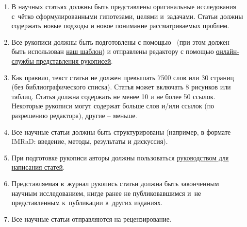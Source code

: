 \begin{enumerate}



\item[1.] В научных статьях должны быть представлены оригинальные исследования с~чётко сформулированными гипотезами, целями и~задачами. Статьи должны содержать новые подходы и новое понимание рассматриваемых проблем.



\item[2.] Все рукописи должны быть подготовлены с помощью \LaTeXe\ (при этом должен быть использован \href{https://www.overleaf.com/read/bzytwtpwfzjj}{наш шаблон}) и отправлены редактору с помощью \href{http://www.mathnet.ru/php/esubmission.phtml?jrnid=vsgtu&wshow=snote&option_lang=rus}{онлайн-службы представления рукописей}.



\item[3.]

Как правило, текст статьи не должен превышать 7500 слов или 30 страниц (без библиографического списка). Статья может включать 8 рисунков или таблиц. Статья должна содержать не менее 10 и не более 50 ссылок. Некоторые рукописи могут содержат больше слов и/или ссылок (по разрешению редактора), другие – меньше.



\item[4.] Все научные статьи должны быть структурированы (например, в формате IMRaD: введение, методы, результаты и дискуссия).



\item[5.] При подготовке рукописи авторы должны пользоваться \href{http://www.mathnet.ru/rus/vsgtu/authornotes#manuscriptPreparingRequirements}{руководством для написания статей}.



\item[6.] Представляемая в~журнал рукопись статьи должна быть законченным научным исследованием, нигде ранее не публиковавшимся и~не представленным к~публикации в~других изданиях. 



\item[7.] Все научные статьи отправляются на рецензирование.



\end{enumerate}






